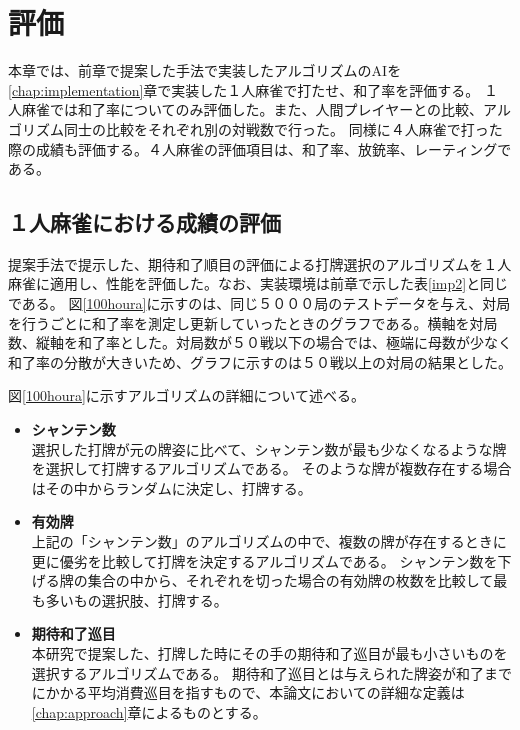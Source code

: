 \chapter{評価}
\label{chap:evaluation}

本章では、前章で提案した手法で実装したアルゴリズムのAIを\ref{chap:implementation}章で実装した１人麻雀で打たせ、和了率を評価する。
１人麻雀では和了率についてのみ評価した。また、人間プレイヤーとの比較、アルゴリズム同士の比較をそれぞれ別の対戦数で行った。
同様に４人麻雀で打った際の成績も評価する。４人麻雀の評価項目は、和了率、放銃率、レーティングである。

\section{１人麻雀における成績の評価}
提案手法で提示した、期待和了順目の評価による打牌選択のアルゴリズムを１人麻雀に適用し、性能を評価した。なお、実装環境は前章で示した表\ref{imp2}と同じである。
図\ref{100houra}に示すのは、同じ５０００局のテストデータを与え、対局を行うごとに和了率を測定し更新していったときのグラフである。横軸を対局数、縦軸を和了率とした。対局数が５０戦以下の場合では、極端に母数が少なく和了率の分散が大きいため、グラフに示すのは５０戦以上の対局の結果とした。

図\ref{100houra}に示すアルゴリズムの詳細について述べる。

\begin{itemize}
 \item {\bf シャンテン数} \mbox{}\\ 
  選択した打牌が元の牌姿に比べて、シャンテン数が最も少なくなるような牌を選択して打牌するアルゴリズムである。
  そのような牌が複数存在する場合はその中からランダムに決定し、打牌する。
 \item {\bf 有効牌} \mbox{}\\
      上記の「シャンテン数」のアルゴリズムの中で、複数の牌が存在するときに更に優劣を比較して打牌を決定するアルゴリズムである。
      シャンテン数を下げる牌の集合の中から、それぞれを切った場合の有効牌の枚数を比較して最も多いもの選択肢、打牌する。
 \item {\bf 期待和了巡目} \mbox{}\\
      本研究で提案した、打牌した時にその手の期待和了巡目が最も小さいものを選択するアルゴリズムである。
      期待和了巡目とは与えられた牌姿が和了までにかかる平均消費巡目を指すもので、本論文においての詳細な定義は\ref{chap:approach}章によるものとする。
\end{itemize}


